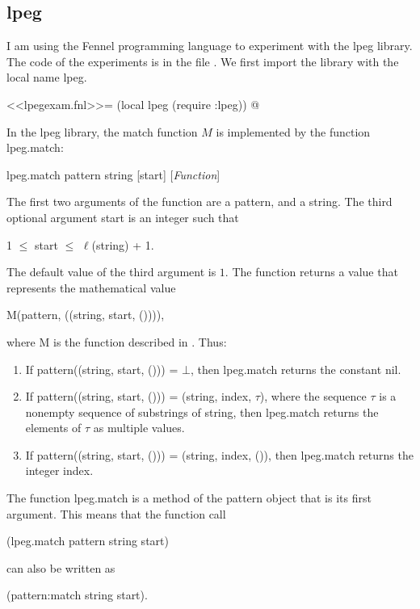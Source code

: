 \documentclass{article}
\begin{document}
\subsection{lpeg}
\label{sec:2pj8tomh}

I am using the Fennel programming language \parencite{bib:3jfp5s36} to
experiment with the \textsf{lpeg} library.  The code of the
experiments is in the file .  We first import
the library with the local name \textsf{lpeg}.
\begin{codechunk}
<<lpegexam.fnl>>=
(local lpeg (require :lpeg))
@ %
\end{codechunk}

In the \textsf{lpeg} library, the match function \(M\) is implemented
by the function \textsf{lpeg.match}:
\begin{flushleft}
  \textsf{lpeg.match pattern string [start]} \hfill
  [\textit{Function}]
\end{flushleft}
The first two arguments of the function are a pattern, and a string.
The third optional argument \textsf{start} is an integer such that
\begin{center}
  1 \(\leq\) \textsf{start} \(\leq\) \(\ell\)(\textsf{string}) + 1.
\end{center}
The default value of the third argument is \(1\).  The function
returns a value that represents the mathematical value
\begin{center}
  \textsf{M(pattern, ((string, start, ())))},
\end{center}
where \textsf{M} is the function described in .
Thus:
\begin{enumerate}
\item If \textsf{pattern((string, start, ())) = \(\bot\)}, then
  \textsf{lpeg.match} returns the constant \textsf{nil}.
\item If \textsf{pattern((string, start, ())) = (string, index,
    \(\tau\))}, where the sequence \(\tau\) is a nonempty sequence of
  substrings of \textsf{string}, then \textsf{lpeg.match} returns the
  elements of \(\tau\) as multiple values.
\item If \textsf{pattern((string, start, ())) = (string, index, ())},
  then \textsf{lpeg.match} returns the integer \textsf{index}.
\end{enumerate}

The function \textsf{lpeg.match} is a method of the pattern object
that is its first argument.  This means that the function call
\begin{center}
  \textsf{(lpeg.match pattern string start)}
\end{center}
can also be written as
\begin{center}
  \textsf{(pattern:match string start)}.
\end{center}
\end{document}

